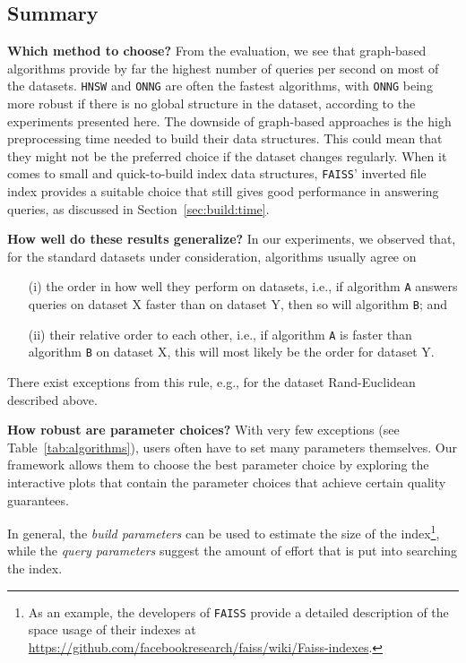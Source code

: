 \subsection{Summary}

\noindent\textbf{Which method to choose?} From the evaluation, we see that graph-based algorithms provide by far the highest number of queries per second on most of the datasets. \texttt{HNSW} and \texttt{ONNG} are often the fastest algorithms, with \texttt{ONNG} being more robust if there is no global structure in the dataset, according to the experiments presented here. The downside of graph-based approaches is the high preprocessing time needed to build their data structures. This could mean that they might not be the preferred choice if the dataset changes regularly. When it comes to small and quick-to-build index data structures, \texttt{FAISS}' inverted file index provides a suitable choice that still gives good performance in answering queries, as discussed in Section~\ref{sec:build:time}.

\medskip

\noindent\textbf{How well do these results generalize?} In our experiments, we observed that, for the standard datasets under consideration, algorithms usually agree on 
\begin{itemize}
\item [(i)] the order in how well they perform on datasets, i.e., if algorithm \texttt{A} answers queries on dataset \textsf{X} faster than on dataset \textsf{Y}, then so will algorithm \texttt{B}; and 
\item [(ii)] their relative order to each other, i.e., if algorithm \texttt{A} is faster than algorithm \texttt{B} on dataset \textsf{X}, this will most likely be the order for dataset \textsf{Y}.
\end{itemize}
There exist exceptions from this rule, e.g., for the dataset \textsf{Rand-Euclidean} described above.

\medskip

\noindent\textbf{How robust are parameter choices?} With very few exceptions (see Table~\ref{tab:algorithms}), users often have to set many parameters themselves. Our framework allows them to choose the best parameter choice by exploring the interactive plots that contain the parameter choices that achieve certain quality guarantees. 

In general, the \emph{build parameters} can be used to estimate the size of the index\footnote{As an
example, the developers of \texttt{FAISS} provide a detailed description of the space usage of their indexes at \url{https://github.com/facebookresearch/faiss/wiki/Faiss-indexes}.},
while the \emph{query parameters} suggest the amount of effort that is put into searching the index. 

